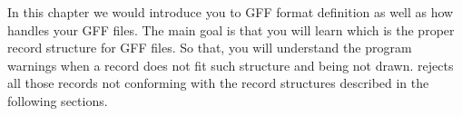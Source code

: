%
%
%
%


In this chapter we would introduce you to GFF format definition as
well as how {\prog} handles your GFF files. The main goal is that you
will learn which is the proper record structure for GFF files. So
that, you will understand the program warnings when a record does not
fit such structure and being not drawn. {\prog} rejects all those
records not conforming with the record structures described in the
following sections.









